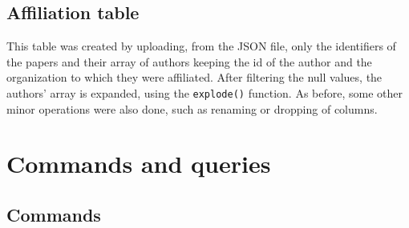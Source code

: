 \section{Affiliation table}
\label{sec:affiliation_table}%
This table was created by uploading, from the JSON file, only the identifiers of the papers and their array of authors keeping the id of the author and the organization to which they were affiliated.
After filtering the null values, the authors' array is expanded, using the \verb|explode()| function.
As before, some other minor operations were also done, such as renaming or dropping of columns.


\chapter{Commands and queries}
\label{ch:commands_and_queries_spark}%


\section{Commands}
\label{sec:commands_spark}%


